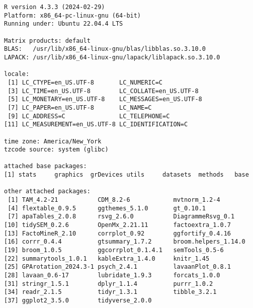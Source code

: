 \documentclass[
  letterpaper,
  DIV=11,
  numbers=noendperiod]{scrartcl}
\begin{document}
\begin{verbatim}
R version 4.3.3 (2024-02-29)
Platform: x86_64-pc-linux-gnu (64-bit)
Running under: Ubuntu 22.04.4 LTS

Matrix products: default
BLAS:   /usr/lib/x86_64-linux-gnu/blas/libblas.so.3.10.0 
LAPACK: /usr/lib/x86_64-linux-gnu/lapack/liblapack.so.3.10.0

locale:
 [1] LC_CTYPE=en_US.UTF-8       LC_NUMERIC=C              
 [3] LC_TIME=en_US.UTF-8        LC_COLLATE=en_US.UTF-8    
 [5] LC_MONETARY=en_US.UTF-8    LC_MESSAGES=en_US.UTF-8   
 [7] LC_PAPER=en_US.UTF-8       LC_NAME=C                 
 [9] LC_ADDRESS=C               LC_TELEPHONE=C            
[11] LC_MEASUREMENT=en_US.UTF-8 LC_IDENTIFICATION=C       

time zone: America/New_York
tzcode source: system (glibc)

attached base packages:
[1] stats     graphics  grDevices utils     datasets  methods   base     

other attached packages:
 [1] TAM_4.2-21           CDM_8.2-6            mvtnorm_1.2-4       
 [4] flextable_0.9.5      ggthemes_5.1.0       gt_0.10.1           
 [7] apaTables_2.0.8      rsvg_2.6.0           DiagrammeRsvg_0.1   
[10] tidySEM_0.2.6        OpenMx_2.21.11       factoextra_1.0.7    
[13] FactoMineR_2.10      corrplot_0.92        ggfortify_0.4.16    
[16] corrr_0.4.4          gtsummary_1.7.2      broom.helpers_1.14.0
[19] broom_1.0.5          ggcorrplot_0.1.4.1   semTools_0.5-6      
[22] summarytools_1.0.1   kableExtra_1.4.0     knitr_1.45          
[25] GPArotation_2024.3-1 psych_2.4.1          lavaanPlot_0.8.1    
[28] lavaan_0.6-17        lubridate_1.9.3      forcats_1.0.0       
[31] stringr_1.5.1        dplyr_1.1.4          purrr_1.0.2         
[34] readr_2.1.5          tidyr_1.3.1          tibble_3.2.1        
[37] ggplot2_3.5.0        tidyverse_2.0.0     


\end{verbatim}
\end{document}
